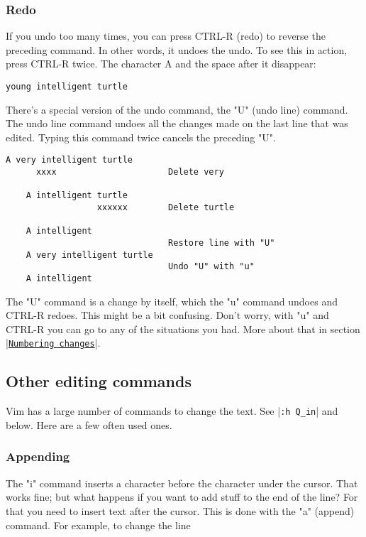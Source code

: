 \subsubsection{Redo}

If you undo too many times, you can press CTRL-R (redo) to reverse the preceding command.
In other words, it undoes the undo.
To see this in action, press CTRL-R twice.
The character A and the space after it disappear: 

		\begin{Verbatim}[samepage=true]
    young intelligent turtle 
		\end{Verbatim}

There's a special version of the undo command, the "U" (undo line) command.
The undo line command undoes all the changes made on the last line that was edited.
Typing this command twice cancels the preceding "U".

		\begin{Verbatim}[samepage=true]
    A very intelligent turtle 
      xxxx                      Delete very

    A intelligent turtle 
                  xxxxxx        Delete turtle

    A intelligent 
                                Restore line with "U"
    A very intelligent turtle 
                                Undo "U" with "u"
    A intelligent 
		\end{Verbatim}

The "U" command is a change by itself, which the "u" command undoes and CTRL-R redoes.
This might be a bit confusing.
Don't worry, with "u" and CTRL-R you can go to any of the situations you had.
More about that in section |\hyperref[Numbering changes]{\texttt{Numbering changes}}|.

\subsection{Other editing commands}

Vim has a large number of commands to change the text.
See |\texttt{:h Q\_in}| and below.
Here are a few often used ones.

\subsubsection{Appending}

The "i" command inserts a character before the character under the cursor.
That works fine; but what happens if you want to add stuff to the end of the line?  For that you need to insert text after the cursor.
This is done with the "a" (append) command.
For example, to change the line 

